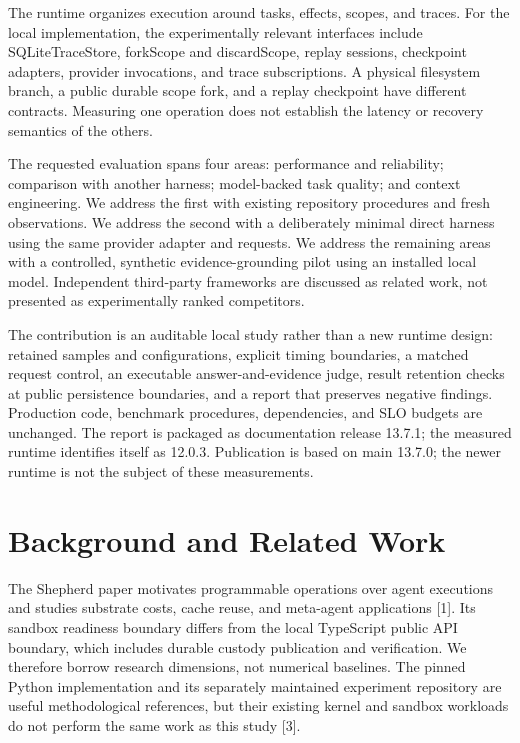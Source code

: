 \documentclass[11pt,a4paper]{article}
\begin{document}
The runtime organizes execution around tasks, effects, scopes, and traces. For the local implementation, the experimentally relevant interfaces include SQLiteTraceStore, forkScope and discardScope, replay sessions, checkpoint adapters, provider invocations, and trace subscriptions. A physical filesystem branch, a public durable scope fork, and a replay checkpoint have different contracts. Measuring one operation does not establish the latency or recovery semantics of the others.


The requested evaluation spans four areas: performance and reliability; comparison with another harness; model-backed task quality; and context engineering. We address the first with existing repository procedures and fresh observations. We address the second with a deliberately minimal direct harness using the same provider adapter and requests. We address the remaining areas with a controlled, synthetic evidence-grounding pilot using an installed local model. Independent third-party frameworks are discussed as related work, not presented as experimentally ranked competitors.


The contribution is an auditable local study rather than a new runtime design: retained samples and configurations, explicit timing boundaries, a matched request control, an executable answer-and-evidence judge, result retention checks at public persistence boundaries, and a report that preserves negative findings. Production code, benchmark procedures, dependencies, and SLO budgets are unchanged. The report is packaged as documentation release 13.7.1; the measured runtime identifies itself as 12.0.3. Publication is based on main 13.7.0; the newer runtime is not the subject of these measurements.


\section{Background and Related Work}

The Shepherd paper motivates programmable operations over agent executions and studies substrate costs, cache reuse, and meta-agent applications [1]. Its sandbox readiness boundary differs from the local TypeScript public API boundary, which includes durable custody publication and verification. We therefore borrow research dimensions, not numerical baselines. The pinned Python implementation and its separately maintained experiment repository are useful methodological references, but their existing kernel and sandbox workloads do not perform the same work as this study [3].
\end{document}
